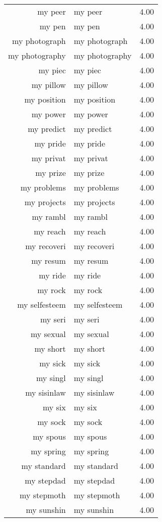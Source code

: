 \begin{table}[ht]
\begin{tabular}{rlr}
  my peer & my peer & 4.00 \\ 
  my pen & my pen & 4.00 \\ 
  my photograph & my photograph & 4.00 \\ 
  my photography & my photography & 4.00 \\ 
  my piec & my piec & 4.00 \\ 
  my pillow & my pillow & 4.00 \\ 
  my position & my position & 4.00 \\ 
  my power & my power & 4.00 \\ 
  my predict & my predict & 4.00 \\ 
  my pride & my pride & 4.00 \\ 
  my privat & my privat & 4.00 \\ 
  my prize & my prize & 4.00 \\ 
  my problems & my problems & 4.00 \\ 
  my projects & my projects & 4.00 \\ 
  my rambl & my rambl & 4.00 \\ 
  my reach & my reach & 4.00 \\ 
  my recoveri & my recoveri & 4.00 \\ 
  my resum & my resum & 4.00 \\ 
  my ride & my ride & 4.00 \\ 
  my rock & my rock & 4.00 \\ 
  my selfesteem & my selfesteem & 4.00 \\ 
  my seri & my seri & 4.00 \\ 
  my sexual & my sexual & 4.00 \\ 
  my short & my short & 4.00 \\ 
  my sick & my sick & 4.00 \\ 
  my singl & my singl & 4.00 \\ 
  my sisinlaw & my sisinlaw & 4.00 \\ 
  my six & my six & 4.00 \\ 
  my sock & my sock & 4.00 \\ 
  my spous & my spous & 4.00 \\ 
  my spring & my spring & 4.00 \\ 
  my standard & my standard & 4.00 \\ 
  my stepdad & my stepdad & 4.00 \\ 
  my stepmoth & my stepmoth & 4.00 \\ 
  my sunshin & my sunshin & 4.00 \\ 

\end{tabular}
\end{table}
